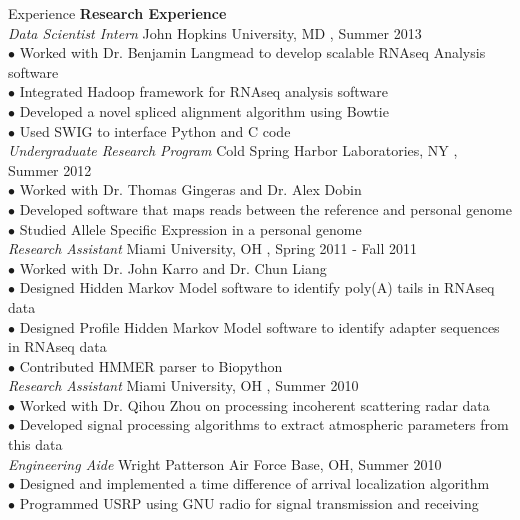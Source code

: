 \documentclass{resume} %
\begin{document}
\begin{rSection}{Experience}
  \textbf{Research Experience}\\[1 mm]
  \textit{Data Scientist Intern} \hfill John Hopkins University, MD , Summer 2013 \\ [1 mm]
  $\bullet$ Worked with Dr. Benjamin Langmead to develop scalable RNAseq Analysis software \\
  $\bullet$ Integrated Hadoop framework for RNAseq analysis software \\
  $\bullet$ Developed a novel spliced alignment algorithm using Bowtie \\
  $\bullet$ Used SWIG to interface Python and C code \\[3 mm]
  \textit{Undergraduate Research Program} \hfill Cold Spring Harbor Laboratories, NY , Summer 2012 \\ [1 mm]
  $\bullet$ Worked with Dr. Thomas Gingeras and Dr. Alex Dobin\\
  $\bullet$ Developed software that maps reads between the reference and personal genome \\
  $\bullet$ Studied Allele Specific Expression in a personal genome \\[3 mm]
  \textit{Research Assistant} \hfill Miami University, OH , Spring 2011 - Fall 2011 \\ [1 mm]
  $\bullet$ Worked with Dr. John Karro and Dr. Chun Liang\\
  $\bullet$ Designed Hidden Markov Model software to identify poly(A) tails in RNAseq data\\
  $\bullet$ Designed Profile Hidden Markov Model software to identify adapter sequences in RNAseq data\\
  $\bullet$ Contributed HMMER parser to Biopython\\[20 mm]
  \textit{Research Assistant} \hfill Miami University, OH , Summer 2010 \\ [1 mm]
  $\bullet$ Worked with Dr. Qihou Zhou on processing incoherent scattering radar data\\
  $\bullet$ Developed signal processing algorithms to extract atmospheric parameters from this data\\[3 mm]
  \textit{Engineering Aide} \hfill Wright Patterson Air Force Base, OH, Summer 2010 \\ [1 mm]
  $\bullet$ Designed and implemented a time difference of arrival localization algorithm \\
  $\bullet$ Programmed USRP using GNU radio for signal transmission and receiving \\[3 mm]

\end{rSection}
\end{document}
